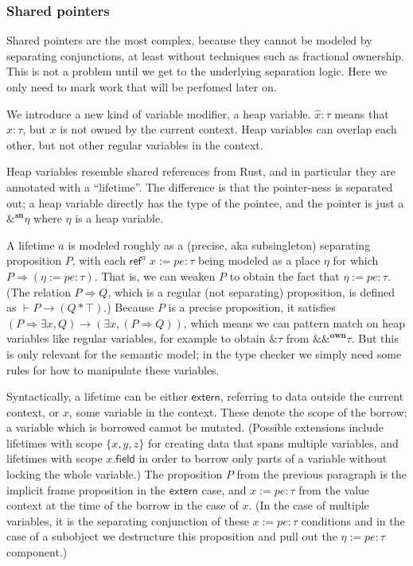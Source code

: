 \documentclass[acmsmall,nonacm]{acmart}
\newcommand{\proves}{\vdash}
\begin{document}
\subsubsection{Shared pointers}

Shared pointers are the most complex, because they cannot be modeled by separating conjunctions, at least without techniques such as fractional ownership. This is not a problem until we get to the underlying separation logic. Here we only need to mark work that will be perfomed later on.

We introduce a new kind of variable modifier, a heap variable. $\hat x:\tau$ means that $x:\tau$, but $x$ is not owned by the current context. Heap variables can overlap each other, but not other regular variables in the context.

Heap variables resemble shared references from Rust, and in particular they are annotated with a ``lifetime''. The difference is that the pointer-ness is separated out; a heap variable directly has the type of the pointee, and the pointer is just a $\&^\mathbf{sn}\eta$ where $\eta$ is a heap variable.

A lifetime $a$ is modeled roughly as a (precise, aka subsingleton) separating proposition $P$, with each $\mathsf{ref}^a\;x:=pe:\tau$ being modeled as a place $\eta$ for which $P\Rightarrow (\eta:=pe:\tau)$. That is, we can weaken $P$ to obtain the fact that $\eta:=pe:\tau$. (The relation $P\Rightarrow Q$, which is a regular (not separating) proposition, is defined as $\proves P\to (Q*\top)$.) Because $P$ is a precise proposition, it satisfies $(P\Rightarrow \exists x, Q)\to (\exists x,(P\Rightarrow Q))$, which means we can pattern match on heap variables like regular variables, for example to obtain $\&\tau$ from $\&\&^\mathbf{own}\tau$. But this is only relevant for the semantic model; in the type checker we simply need some rules for how to manipulate these variables.

Syntactically, a lifetime can be either $\mathsf{extern}$, referring to data outside the current context, or $x$, some variable in the context. These denote the scope of the borrow; a variable which is borrowed cannot be mutated. (Possible extensions include lifetimes with scope $\{x,y,z\}$ for creating data that spans multiple variables, and lifetimes with scope $x.\mathsf{field}$ in order to borrow only parts of a variable without locking the whole variable.) The proposition $P$ from the previous paragraph is the implicit frame proposition in the $\mathsf{extern}$ case, and $x:=pe:\tau$ from the value context at the time of the borrow in the case of $x$. (In the case of multiple variables, it is the separating conjunction of these $x:=pe:\tau$ conditions and in the case of a subobject we destructure this proposition and pull out the $\eta:=pe:\tau$ component.)
\end{document}
